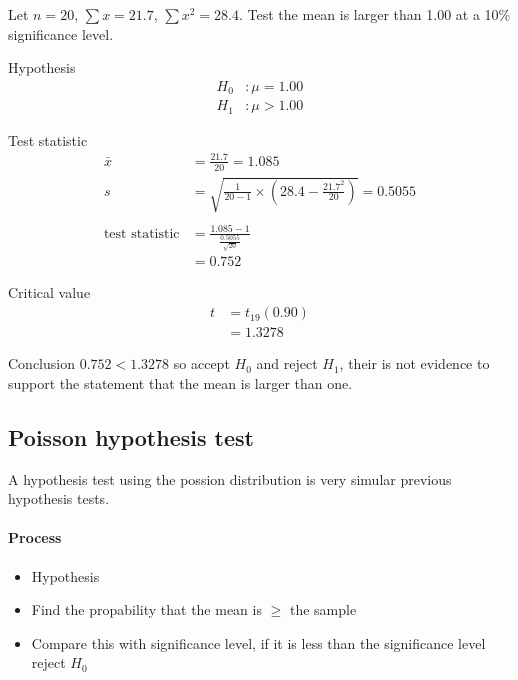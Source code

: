         \begin{example}
        {
            Let $n = 20$, $\sum{x} = 21.7$, $\sum{x^2} = 28.4$. Test the mean is larger than 1.00 at a 10\% significance level.
        }

        \begin{step}{Hypothesis}
        \begin{align*}
        H_0&: \mu = 1.00\\
        H_1&: \mu > 1.00
        \end{align*}
        \end{step}

        \begin{step}{Test statistic}
        \begin{align*}
        \bar{x} &= \frac{21.7}{20} = 1.085 \\
        s &= \sqrt{\frac{1}{20 - 1} \times (28.4 - \frac{21.7^2}{20})} = 0.5055 \\ 
        \\
        \text{test statistic} &= \frac{1.085 - 1}{\frac{0.5055}{\sqrt{20}}} \\
        &= 0.752
        \end{align*}
        \end{step}

        \begin{step}{Critical value}
        \begin{align*}
        t &= t_{19}(0.90) \\ 
        &= 1.3278
        \end{align*}
        \end{step}

        \begin{step}{Conclusion}
        $0.752 < 1.3278$ so accept $H_0$ and reject $H_1$, their is not evidence to support the statement that the mean is larger than one.
        \end{step}

        \end{example}


    \subsection{Poisson hypothesis test}
        A hypothesis test using the possion distribution is very simular previous hypothesis tests.

        \paragraph{Process}
        \begin{itemize}
        \item Hypothesis
        \item Find the propability that the mean is $\geq$ the sample
        \item Compare this with significance level, if it is less than the significance level reject $H_0$
        \end{itemize}

